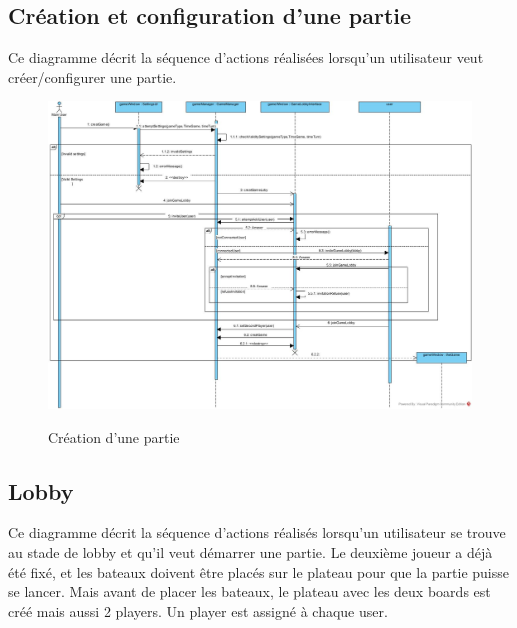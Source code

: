\documentclass[../design_fonctionnement_sys.tex]{subfiles}
\begin{document}
\subsection{Création et configuration d'une partie}
Ce diagramme décrit la séquence d'actions réalisées lorsqu'un utilisateur veut créer/configurer une partie.

\begin{figure}[H]
    \centering
    \includegraphics[scale=0.3]{img_design/PreLoby.jpg}
    \label{fig:seq_match_client}
    \caption{Création d'une partie}
\end{figure}

\newpage

\subsection{Lobby}
Ce diagramme décrit la séquence d'actions réalisés lorsqu'un utilisateur se trouve au stade de lobby et qu'il veut démarrer une partie.
Le deuxième joueur a déjà été fixé, et les bateaux doivent être placés sur le plateau pour que la partie puisse se lancer.
Mais avant de placer les bateaux, le plateau avec les deux boards est créé mais aussi 2 players. Un player est assigné à chaque user.
\end{document}
